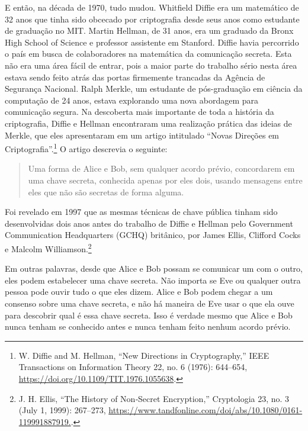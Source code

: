 \documentclass{book}
\begin{document}
E então, na década de 1970, tudo mudou. Whitfield Diffie era um matemático de 32 anos que tinha sido obcecado por criptografia desde seus anos como estudante de graduação no MIT. Martin Hellman, de 31 anos, era um graduado da Bronx High School of Science e professor assistente em Stanford. Diffie havia percorrido o país em busca de colaboradores na matemática da comunicação secreta. Esta não era uma área fácil de entrar, pois a maior parte do trabalho sério nesta área estava sendo feito atrás das portas firmemente trancadas da Agência de Segurança Nacional. Ralph Merkle, um estudante de pós-graduação em ciência da computação de 24 anos, estava explorando uma nova abordagem para comunicação segura. Na descoberta mais importante de toda a história da criptografia, Diffie e Hellman encontraram uma realização prática das ideias de Merkle, que eles apresentaram em um artigo intitulado ``Novas Direções em Criptografia''.\footnote{W. Diffie and M. Hellman, “New Directions in Cryptography,” IEEE Transactions on Information Theory 22, no. 6 (1976): 644–654, \url{https://doi.org/10.1109/TIT.1976.1055638}.} O artigo descrevia o seguinte: 
\begin{quote}
    Uma forma de Alice e Bob, sem qualquer acordo prévio, concordarem em uma chave secreta, conhecida apenas por eles dois, usando mensagens entre eles que não são secretas de forma alguma.
\end{quote}


Foi revelado em 1997 que as mesmas técnicas de chave pública tinham sido desenvolvidas dois anos antes do trabalho de Diffie e Hellman pelo Government Communication Headquarters (GCHQ) britânico, por James Ellis, Clifford Cocks e Malcolm Williamson.\footnote{J. H. Ellis, “The History of Non‐Secret Encryption,” Cryptologia 23, no. 3 (July 1, 1999): 267–273, \url{https://www.tandfonline.com/doi/abs/10.1080/0161-119991887919.}.}

Em outras palavras, desde que Alice e Bob possam se comunicar um com o outro, eles podem estabelecer uma chave secreta. Não importa se Eve ou qualquer outra pessoa pode ouvir tudo o que eles dizem. Alice e Bob podem chegar a um consenso sobre uma chave secreta, e não há maneira de Eve usar o que ela ouve para descobrir qual é essa chave secreta. Isso é verdade mesmo que Alice e Bob nunca tenham se conhecido antes e nunca tenham feito nenhum acordo prévio.
\end{document}
